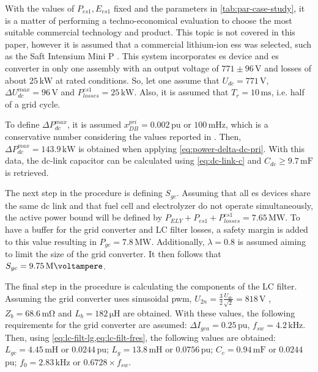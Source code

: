 \documentclass[utf8]{frontiersSCNS} %
\begin{document}
With the values of $P_{es1}, E_{es1}$ fixed and the parameters in \cref{tab:par-case-study}, it is a matter of performing a techno-economical evaluation to choose the most suitable commercial technology and product. This topic is not covered in this paper, however it is assumed that a commercial lithium-ion \gls{ess} was selected, such as the Saft Intensium Mini P \citep{saftIntensiumMax20P2017}. This system incorporates \gls{es} device and \gls{es} converter in only one assembly with an output voltage of $771 \pm 96\,\si{\volt}$ and losses of about $25\,\si{\kilo\watt}$ at rated conditions. So, let one assume that $U_{dc}=771$\,\si{\volt}, $ \Delta U_{dc}^{max}=96\,\si{\volt}$ and $P_{losses}^{es1}=25\,\si{\kilo\watt}$. Also, it is assumed that $T_r = 10\,\si{\milli\second}$, i.e. half of a grid cycle.

To define $ \Delta P_{dc}^{max}$, it is assumed $x_{DB}^{pri}=0.002$\,pu or $100\,\si{\milli\hertz}$, which is a conservative number considering the values reported in \cite{IEEEStd154720182018,comissionregulationeuNetworkCodeRequirements2016}. Then, $ \Delta P_{dc}^{max}=143.9\,\si{\kilo\watt}$ is obtained when applying \cref{eq:power-delta-dc-pri}. With this data, the dc-link capacitor can be calculated using \cref{eq:dc-link-c} and $C_{dc} \ge 9.7\,\si{\milli\farad}$ is retrieved.

The next step in the procedure is defining $S_{gc}$. Assuming that all \gls{es} devices share the same dc link and that fuel cell and electrolyzer do not operate simultaneously, the active power bound will be defined by $P_{ELY} + P_{es1} + P_{losses}^{es1} = 7.65\,\si{\mega\watt}$. To have a buffer for the grid converter and LC filter losses, a safety margin is added to this value resulting in $P_{gc} = 7.8\, \si{\mega\watt}$. Additionally, $ \lambda = 0.8$ is assumed aiming to limit the size of the grid converter. It then follows that $S_{gc} = 9.75\,\si{\mega\voltampere}$.

The final step in the procedure is calculating the components of the LC filter. Assuming the grid converter uses sinusoidal \gls{pwm}, $U_{2n} = \frac{3}{2} \frac{U_{dc}}{\sqrt{2}} = 818\,\si{\volt}$ \citep{ericksonFundamentalsPowerElectronics2001}, $Z_b = 68.6\,\si{\milli\ohm}$ and $L_b = 182\,\si{\micro\henry}$ are obtained. With these values, the following requirements for the grid converter are assumed: $ \Delta I_{gca} = 0.25$\,pu, $f_{sw} = 4.2\,\si{\kilo\hertz}$. Then, using \cref{eq:lc-filt-lg,eq:lc-filt-fres}, the following values are obtained: $L_{gc}=4.45\,\si{\milli\henry}$ or $0.0244$\,pu; $L_{g}=13.8\,\si{\milli\henry}$ or $0.0756$\,pu; $C_c=0.94\,\si{\milli\farad}$ or $0.0244$\,pu; $f_{0}=2.83\,\si{\kilo\hertz}$ or $0.6728 \times f_{sw}$.
\end{document}
